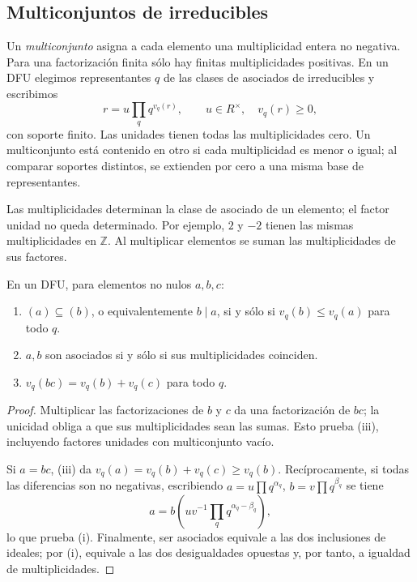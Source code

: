 \subsection{Multiconjuntos de irreducibles}\label{tema:16-2-1}
Un \emph{multiconjunto} asigna a cada elemento una multiplicidad entera no negativa. Para una factorización finita sólo hay finitas multiplicidades positivas. En un DFU elegimos representantes $q$ de las clases de asociados de irreducibles y escribimos
\[
r=u\prod_q q^{v_q(r)},\qquad
u\in R^\times,\quad v_q(r)\geq0,
\]
con soporte finito. Las unidades tienen todas las multiplicidades cero. Un multiconjunto está contenido en otro si cada multiplicidad es menor o igual; al comparar soportes distintos, se extienden por cero a una misma base de representantes.
\begin{obs}
Las multiplicidades determinan la clase de asociado de un elemento; el factor unidad no queda determinado. Por ejemplo, $2$ y $-2$ tienen las mismas multiplicidades en $\mathbb Z$. Al multiplicar elementos se suman las multiplicidades de sus factores.
\end{obs}

\begin{lema}\label{lema:C16-multiplicidades}
En un DFU, para elementos no nulos $a,b,c$:
\begin{enumerate}[label=\textup{(\roman*)}]
\item $(a)\subseteq(b)$, o equivalentemente $b\mid a$, si y sólo si $v_q(b)\leq v_q(a)$ para todo $q$.
\item $a,b$ son asociados si y sólo si sus multiplicidades coinciden.
\item $v_q(bc)=v_q(b)+v_q(c)$ para todo $q$.
\end{enumerate}
\end{lema}
\begin{proof}
Multiplicar las factorizaciones de $b$ y $c$ da una factorización de $bc$; la unicidad obliga a que sus multiplicidades sean las sumas. Esto prueba (iii), incluyendo factores unidades con multiconjunto vacío.

Si $a=bc$, (iii) da $v_q(a)=v_q(b)+v_q(c)\geq v_q(b)$. Recíprocamente, si todas las diferencias son no negativas, escribiendo $a=u\prod q^{\alpha_q}$, $b=v\prod q^{\beta_q}$ se tiene
\[
a=b\left(uv^{-1}\prod_q q^{\alpha_q-\beta_q}\right),
\]
lo que prueba (i). Finalmente, ser asociados equivale a las dos inclusiones de ideales; por (i), equivale a las dos desigualdades opuestas y, por tanto, a igualdad de multiplicidades.
\end{proof}

